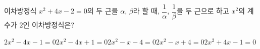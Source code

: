 이차방정식 $x^2+4x-2=0$의 두 근을 $\alpha$, $\beta$라 할 때, $\dfrac{1}{\alpha}$, $\dfrac{1}{\beta}$을 두 근으로 하고 $x^2$의 계수가 $2$인 이차방정식은?
\begin{choicesii}{$2x^2-4x-1=0$}{$2x^2-4x+1=0$}{$2x^2-x-4=0$}{$2x^2-x+4=0$}{$2x^2+4x-1=0$}\end{choicesii}
